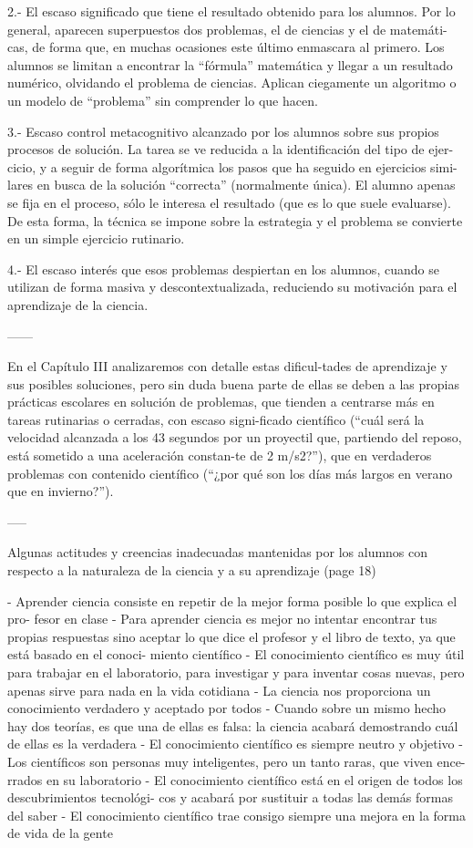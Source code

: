 2.- El escaso significado que tiene el resultado obtenido para los alumnos. Por lo general, aparecen superpuestos dos problemas, el de ciencias y el de matemáti- cas, de forma que, en muchas ocasiones este último enmascara al primero. Los alumnos se limitan a encontrar la “fórmula” matemática y llegar a un resultado numérico, olvidando el problema de ciencias. Aplican ciegamente un algoritmo o un modelo de “problema” sin comprender lo que hacen.

3.- Escaso control metacognitivo alcanzado por los alumnos sobre sus propios procesos de solución. La tarea se ve reducida a la identificación del tipo de ejer- cicio, y a seguir de forma algorítmica los pasos que ha seguido en ejercicios simi- lares en busca de la solución “correcta” (normalmente única). El alumno apenas se fija en el proceso, sólo le interesa el resultado (que es lo que suele evaluarse). De esta forma, la técnica se impone sobre la estrategia y el problema se convierte en un simple ejercicio rutinario.

4.- El escaso interés que esos problemas despiertan en los alumnos, cuando se utilizan de forma masiva y descontextualizada, reduciendo su motivación para el aprendizaje de la ciencia.

------

En el Capítulo III analizaremos con detalle estas dificul-tades de aprendizaje y sus posibles soluciones, pero sin duda buena parte de ellas se deben a las propias prácticas escolares en solución de problemas, que tienden a centrarse más en tareas rutinarias o cerradas, con escaso signi-ficado científico (“cuál será la velocidad alcanzada a los 43 segundos por un proyectil que, partiendo del reposo, está sometido a una aceleración constan-te de 2 m/s2?”), que en verdaderos problemas con contenido científico (“¿por qué son los días más largos en verano que en invierno?”).

-----

Algunas actitudes y creencias inadecuadas mantenidas por los alumnos con respecto a la naturaleza de la ciencia y a su aprendizaje (page 18)

- Aprender ciencia consiste en repetir de la mejor forma posible lo que explica el pro- fesor en clase
- Para aprender ciencia es mejor no intentar encontrar tus propias respuestas sino aceptar lo que dice el profesor y el libro de texto, ya que está basado en el conoci- miento científico
- El conocimiento científico es muy útil para trabajar en el laboratorio, para investigar y para inventar cosas nuevas, pero apenas sirve para nada en la vida cotidiana
- La ciencia nos proporciona un conocimiento verdadero y aceptado por todos - Cuando sobre un mismo hecho hay dos teorías, es que una de ellas es falsa: la ciencia acabará demostrando cuál de ellas es la verdadera
- El conocimiento científico es siempre neutro y objetivo - Los científicos son personas muy inteligentes, pero un tanto raras, que viven ence- rrados en su laboratorio
- El conocimiento científico está en el origen de todos los descubrimientos tecnológi- cos y acabará por sustituir a todas las demás formas del saber
- El conocimiento científico trae consigo siempre una mejora en la forma de vida de la gente

